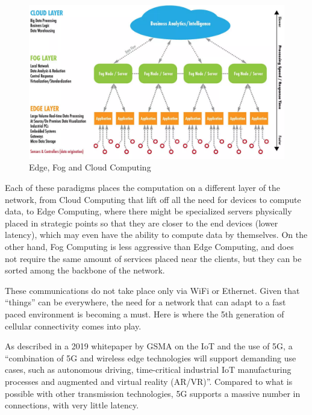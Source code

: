 			\begin{figure}[h]
				\centering
				\includegraphics[width=\textwidth]{resources/img/chap2/computing_paradigms}
				\caption{Edge, Fog and Cloud Computing}
				\label{computing_paradigms}
			\end{figure}
		
			Each of these paradigms places the computation on a different layer of the network, from Cloud Computing that lift off all the need for devices to compute data, to Edge Computing, where there might be specialized servers physically placed in strategic points so that they are closer to the end devices (lower latency), which may even have the ability to compute data by themselves.
			On the other hand, Fog Computing is less aggressive than Edge Computing, and does not require the same amount of services placed near the clients, but they can be sorted among the backbone of the network.
			
			These communications do not take place only via WiFi or Ethernet.
			Given that ``things'' can be everywhere, the need for a network that can adapt to a fast paced environment is becoming a must.
			Here is where the 5th generation of cellular connectivity comes into play.
			
			As described in a 2019 whitepaper by GSMA on the IoT and the use of 5G, a ``combination of 5G and wireless edge technologies will support demanding  use cases, such as autonomous driving, time-critical industrial IoT manufacturing processes and  augmented and virtual reality (AR/VR)''\cite{IoT_5g_era}.
			Compared to what is possible with other transmission technologies, 5G supports a massive number in connections, with very little latency.
				
